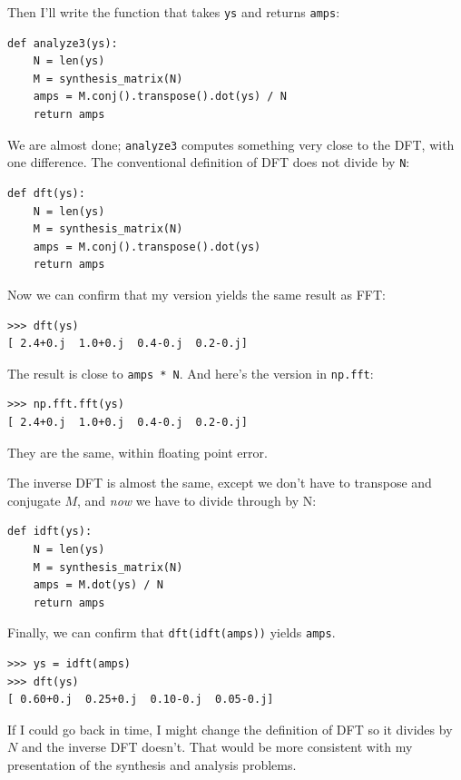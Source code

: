 \documentclass[12pt]{book}
\begin{document}
Then I'll write the function that takes {\tt ys} and returns 
{\tt amps}:

\begin{verbatim}
def analyze3(ys):
    N = len(ys)
    M = synthesis_matrix(N)
    amps = M.conj().transpose().dot(ys) / N
    return amps
\end{verbatim}

We are almost done; {\tt analyze3} computes something very
close to the DFT, with one difference.  The conventional definition
of DFT does not divide by {\tt N}:

\begin{verbatim}
def dft(ys):
    N = len(ys)
    M = synthesis_matrix(N)
    amps = M.conj().transpose().dot(ys)
    return amps
\end{verbatim}

Now we can confirm that my version yields the same result as
FFT:

\begin{verbatim}
>>> dft(ys)
[ 2.4+0.j  1.0+0.j  0.4-0.j  0.2-0.j]
\end{verbatim}

The result is close to {\tt amps * N}.
And here's the version in {\tt np.fft}:

\begin{verbatim}
>>> np.fft.fft(ys)
[ 2.4+0.j  1.0+0.j  0.4-0.j  0.2-0.j]
\end{verbatim}

They are the same, within floating point error.

The inverse DFT is almost the same, except we don't have to transpose
and conjugate $M$, and {\em now} we have to divide through by N:

\begin{verbatim}
def idft(ys):
    N = len(ys)
    M = synthesis_matrix(N)
    amps = M.dot(ys) / N
    return amps
\end{verbatim}

Finally, we can confirm that {\tt dft(idft(amps))} yields {\tt amps}.

\begin{verbatim}
>>> ys = idft(amps)
>>> dft(ys)
[ 0.60+0.j  0.25+0.j  0.10-0.j  0.05-0.j]
\end{verbatim}

If I could go back in time, I might change the definition of
DFT so it divides by $N$ and the inverse DFT doesn't.  That would
be more consistent with my presentation of the synthesis and analysis
problems.
\end{document}
